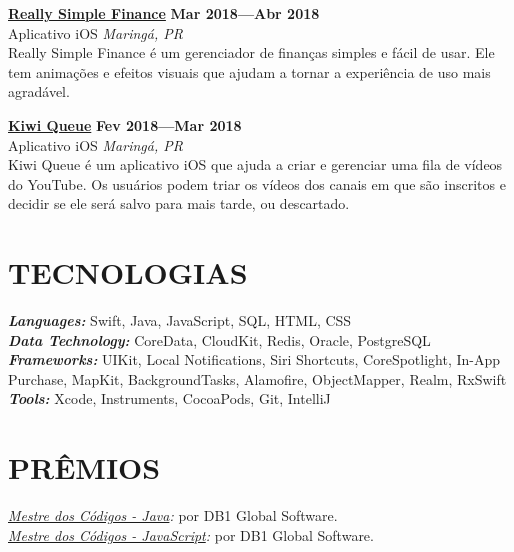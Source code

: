 \documentclass[line,margin]{res}
\begin{document}
\begin{resume}
  {\bf \href{https://itunes.apple.com/us/app/really-simple-finance/id1370859710}{Really Simple Finance}} \hfill {\bf Mar 2018---Abr 2018} \\
  Aplicativo iOS \hfill {\sl Maring\'a, PR}\\[6pt]
  Really Simple Finance é um gerenciador de finanças simples e fácil de usar. Ele tem animações e efeitos visuais que ajudam a tornar a experiência de uso mais agradável.

  {\bf \href{https://itunes.apple.com/us/app/kiwi-queue/id1352747116}{Kiwi Queue}} \hfill {\bf Fev 2018---Mar 2018} \\
  Aplicativo iOS \hfill {\sl Maring\'a, PR}\\[6pt]
  Kiwi Queue é um aplicativo iOS que ajuda a criar e gerenciar uma fila de vídeos do YouTube. Os usuários podem triar os vídeos dos canais em que são inscritos e decidir se ele será salvo para mais tarde, ou descartado.


\section{TECNOLOGIAS}
  {\sl {\bf Languages:}} Swift, Java, JavaScript, SQL, HTML, CSS \\
  {\sl {\bf Data Technology:}} CoreData, CloudKit, Redis, Oracle, PostgreSQL \\
  {\sl {\bf Frameworks:}} UIKit, Local Notifications, Siri Shortcuts, CoreSpotlight, In-App Purchase, MapKit, BackgroundTasks, Alamofire, ObjectMapper, Realm, RxSwift \\
  {\sl {\bf Tools:}} Xcode, Instruments, CocoaPods, Git, IntelliJ


\section{PRÊMIOS}             
  {\sl \href{https://mestredoscodigos.com.br/primeira-entrega-dos-pins-do-mestre-dos-codigos}{Mestre dos C\'odigos - Java}:} por DB1 Global Software.\\
  {\sl \href{https://mestredoscodigos.com.br/primeira-entrega-dos-pins-do-mestre-dos-codigos}{Mestre dos C\'odigos - JavaScript}:} por DB1 Global Software.\\
 

\end{resume}
\end{document}
